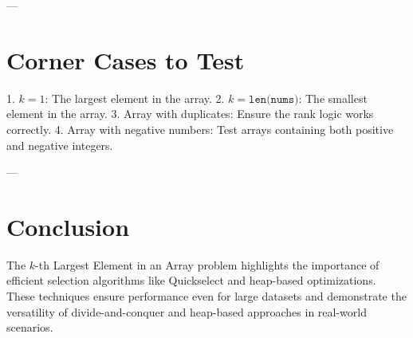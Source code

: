 ---

\section*{Corner Cases to Test}
1. \(k = 1\): The largest element in the array.
2. \(k = \texttt{len(nums)}\): The smallest element in the array.
3. Array with duplicates: Ensure the rank logic works correctly.
4. Array with negative numbers: Test arrays containing both positive and negative integers.

---

\section*{Conclusion}
The \(k\)-th Largest Element in an Array problem highlights the importance of efficient selection algorithms like Quickselect and heap-based optimizations. These techniques ensure performance even for large datasets and demonstrate the versatility of divide-and-conquer and heap-based approaches in real-world scenarios.